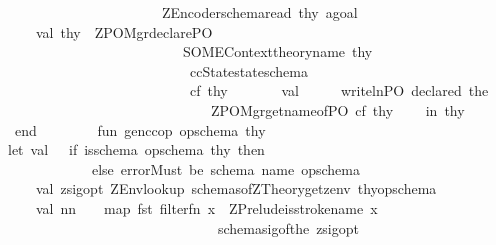 \begin{isabellebody}
\ \ \ \ \ \ \ \ \ \ \ \ \ \ \ \ \ \ \ \ \ \ \ \ \ {\isacharparenleft}ZEncoder{\isachardot}schema{\isacharunderscore}read\ thy\ agoal{\isacharparenright}\isanewline
\ \ \ \ \ \ \ val\ thy{\isacharprime}\ {\isacharequal}\ ZPO{\isacharunderscore}Mgr{\isachardot}declare{\isacharunderscore}PO\ \isanewline
\ \ \ \ \ \ \ \ \ \ \ \ \ \ \ \ \ \ \ \ \ \ \ \ \ \ \ \ {\isacharparenleft}SOME{\isacharparenleft}Context{\isachardot}theory{\isacharunderscore}name\ thy{\isacharparenright}{\isacharcomma}\isanewline
\ \ \ \ \ \ \ \ \ \ \ \ \ \ \ \ \ \ \ \ \ \ \ \ \ \ \ \ \ {\isachardoublequote}ccState{\isachardoublequote}{\isacharcomma}stateschema{\isacharparenright}\ \isanewline
\ \ \ \ \ \ \ \ \ \ \ \ \ \ \ \ \ \ \ \ \ \ \ \ \ \ \ \ \ cf\ thy\isanewline
\ \ \ \ \ \ \ val\ {\isacharunderscore}\ \ \ \ {\isacharequal}\ writeln{\isacharparenleft}{\isachardoublequote}PO\ declared{\isacharcolon}\ {\isachardoublequote}{\isacharcircum}{\isacharparenleft}the\isanewline
\ \ \ \ \ \ \ \ \ \ \ \ \ \ \ \ \ \ \ \ \ \ \ \ \ \ \ \ \ \ \ \ {\isacharparenleft}ZPO{\isacharunderscore}Mgr{\isachardot}get{\isacharunderscore}name{\isacharunderscore}of{\isacharunderscore}PO\ cf\ thy{\isacharprime}{\isacharparenright}{\isacharparenright}{\isacharparenright}\isanewline
\isanewline
\ \ \ \ in\ thy{\isacharprime}\ \ \isanewline
\ \ \ \ end\ \ \ \ \ \isanewline
\isanewline
\isanewline
\ \ \ fun\ gen{\isacharunderscore}cc{\isacharunderscore}op\ opschema\ thy\ \ \ \ \ \ \ \ \ \ \ \ \ \ \ {\isacharequal}\ \isanewline
\ \ \ let\ val\ {\isacharunderscore}\ {\isacharequal}\ if\ is{\isacharunderscore}schema\ opschema\ thy\ then\ {\isacharparenleft}{\isacharparenright}\isanewline
\ \ \ \ \ \ \ \ \ \ \ \ \ \ \ else\ error{\isacharparenleft}{\isachardoublequote}Must\ be\ schema\ name{\isacharcolon}\ {\isachardoublequote}{\isacharcircum}opschema{\isacharparenright}\isanewline
\ \ \ \ \ \ \ val\ zsig{\isacharunderscore}opt{\isacharequal}\ ZEnv{\isachardot}lookup\ {\isacharparenleft}schemas{\isacharunderscore}of{\isacharparenleft}ZTheory{\isachardot}get{\isacharunderscore}zenv\ thy{\isacharparenright}{\isacharcomma}opschema{\isacharparenright}\isanewline
\ \ \ \ \ \ \ val\ nn\ \ \ {\isacharequal}\ map\ fst\ {\isacharparenleft}filter{\isacharparenleft}fn\ {\isacharparenleft}x{\isacharcomma}{\isacharunderscore}{\isacharparenright}\ {\isacharequal}{\isachargreater}\ ZPrelude{\isachardot}is{\isacharunderscore}stroke{\isacharunderscore}name\ x{\isacharparenright}\isanewline
\ \ \ \ \ \ \ \ \ \ \ \ \ \ \ \ \ \ \ \ \ \ \ \ \ \ \ \ \ \ \ \ \ {\isacharparenleft}schemasig{\isacharunderscore}of{\isacharparenleft}the\ zsig{\isacharunderscore}opt{\isacharparenright}{\isacharparenright}{\isacharparenright}\isanewline

\end{isabellebody}
